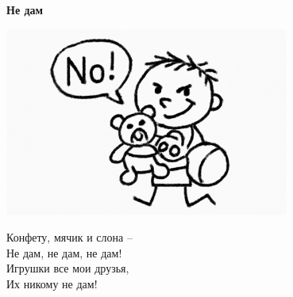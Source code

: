 \vspace*{\fill}
\begin{center}
  {\huge\textbf{Не дам}}

  \vspace{1.5em}
  \includegraphics[width=0.7\textwidth]{pictures/nedam.png}
  \vspace{4em}
  \parbox{0.6\textwidth}{
    \LARGE
    \begin{spacing}{1.2}
      Конфету, мячик и слона – \\
      Не дам, не дам, не дам!\\
      Игрушки все мои друзья,\\
      Их никому не дам! %
    \end{spacing}
      
  }
\end{center}
\vspace*{\fill}